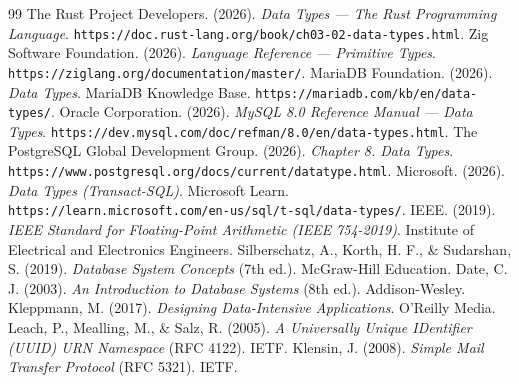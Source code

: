 \documentclass[11pt,a4paper]{article}
\begin{document}
\begin{thebibliography}{99}
	 The Rust Project Developers. (2026). \textit{Data Types --- The Rust Programming Language}. \texttt{https://doc.rust-lang.org/book/ch03-02-data-types.html}.
	 Zig Software Foundation. (2026). \textit{Language Reference --- Primitive Types}. \texttt{https://ziglang.org/documentation/master/}.
	 MariaDB Foundation. (2026). \textit{Data Types}. MariaDB Knowledge Base. \texttt{https://mariadb.com/kb/en/data-types/}.
	 Oracle Corporation. (2026). \textit{MySQL 8.0 Reference Manual --- Data Types}. \texttt{https://dev.mysql.com/doc/refman/8.0/en/data-types.html}.
	 The PostgreSQL Global Development Group. (2026). \textit{Chapter 8. Data Types}. \texttt{https://www.postgresql.org/docs/current/datatype.html}.
	 Microsoft. (2026). \textit{Data Types (Transact-SQL)}. Microsoft Learn. \texttt{https://learn.microsoft.com/en-us/sql/t-sql/data-types/}.
	 IEEE. (2019). \textit{IEEE Standard for Floating-Point Arithmetic (IEEE 754-2019)}. Institute of Electrical and Electronics Engineers.
	 Silberschatz, A., Korth, H. F., \& Sudarshan, S. (2019). \textit{Database System Concepts} (7th ed.). McGraw-Hill Education.
	 Date, C. J. (2003). \textit{An Introduction to Database Systems} (8th ed.). Addison-Wesley.
	 Kleppmann, M. (2017). \textit{Designing Data-Intensive Applications}. O'Reilly Media.
	 Leach, P., Mealling, M., \& Salz, R. (2005). \textit{A Universally Unique IDentifier (UUID) URN Namespace} (RFC 4122). IETF.
	 Klensin, J. (2008). \textit{Simple Mail Transfer Protocol} (RFC 5321). IETF.
\end{thebibliography}
\end{document}
